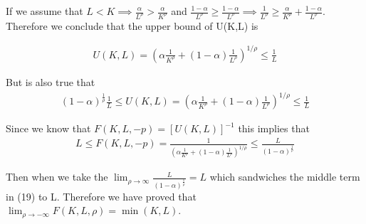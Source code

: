 \begin{itemize}
If we assume that $L<K \implies \frac{\alpha}{L^{\rho}} > \frac{\alpha}{K^{\rho}}$ and  $\frac{1-\alpha}{L^{\rho}} \geq  \frac{1-\alpha}{L^{\rho}} \implies 
\frac{1}{L^{\rho}} \geq  \frac{\alpha}{K^{\rho}} + \frac{1-\alpha}{L^{\rho}}$. \\
Therefore we conclude that the upper bound of U(K,L) is 

    \begin{equation}
    \begin{aligned}
    U(K,L) = (\alpha \frac{1}{K^{\rho}} + (1-\alpha)\frac{1}{L^{\rho}})^{1/\rho} \leq\frac{1}{L} 
    \end{aligned}
    \end{equation}

But is also true that 
    \begin{equation}
    \begin{aligned}
    (1-\alpha)^{\frac{1}{\rho}}\frac{1}{L} \leq U(K,L) = (\alpha \frac{1}{K^{\rho}} + (1-\alpha)\frac{1}{L^{\rho}})^{1/\rho} \leq\frac{1}{L} 
    \end{aligned}
    \end{equation}

Since we know that $F(K,L,-p) = [U(K,L)]^{-1}$ this implies that 
    \begin{equation}
    \begin{aligned}
     L \leq 
    F(K,L,-p) = \frac{1}{(\alpha \frac{1}{K^{\rho}} + (1-\alpha)\frac{1}{L^{\rho}})^{1/\rho}} \leq
    \frac{L}{(1-\alpha)^{\frac{1}{\rho}}}
    \end{aligned}
    \end{equation}

Then when we take the  $\lim_{\rho \to \infty}\frac{L}{(1-\alpha)^{\frac{1}{\rho}}}=L$ which sandwiches the middle term in (19) to L. Therefore we have proved that $\lim_{\rho \to -\infty}F(K,L,\rho) = \min{(K, L)}$.




\end{itemize}





